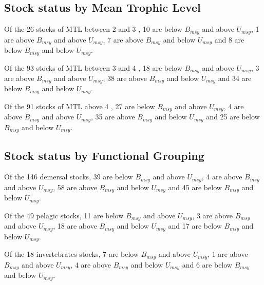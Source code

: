 \subsection*{Stock status by Mean Trophic Level}
Of the 26 stocks of MTL between 2 and 3 , 10 are below $B_{msy}$ and above $U_{msy}$, 1 are above $B_{msy}$ and above $U_{msy}$, 7 are above $B_{msy}$ and below $U_{msy}$ and 8 are below $B_{msy}$ and below $U_{msy}$.

Of the 93 stocks of MTL between 3 and 4 , 18 are below $B_{msy}$ and above $U_{msy}$, 3 are above $B_{msy}$ and above $U_{msy}$, 38 are above $B_{msy}$ and below $U_{msy}$ and 34 are below $B_{msy}$ and below $U_{msy}$.

Of the 91 stocks of MTL above 4 , 27 are below $B_{msy}$ and above $U_{msy}$, 4 are above $B_{msy}$ and above $U_{msy}$, 35 are above $B_{msy}$ and below $U_{msy}$ and 25 are below $B_{msy}$ and below $U_{msy}$.

\subsection*{Stock status by Functional Grouping}
Of the 146 demersal stocks, 39 are below $B_{msy}$ and above $U_{msy}$, 4 are above $B_{msy}$ and above $U_{msy}$, 58 are above $B_{msy}$ and below $U_{msy}$ and 45 are below $B_{msy}$ and below $U_{msy}$.

Of the 49 pelagic stocks, 11 are below $B_{msy}$ and above $U_{msy}$, 3 are above $B_{msy}$ and above $U_{msy}$, 18 are above $B_{msy}$ and below $U_{msy}$ and 17 are below $B_{msy}$ and below $U_{msy}$.

Of the 18 invertebrates stocks, 7 are below $B_{msy}$ and above $U_{msy}$, 1 are above $B_{msy}$ and above $U_{msy}$, 4 are above $B_{msy}$ and below $U_{msy}$ and 6 are below $B_{msy}$ and below $U_{msy}$.
